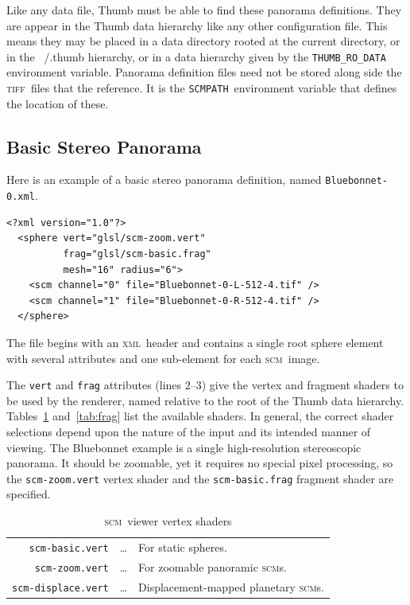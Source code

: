 \documentclass[oneside,10pt]{memoir}
\newcommand{\scm}     {\textsc{scm}}
\newcommand{\tiff}    {\textsc{tiff}}
\newcommand{\xml}     {\textsc{xml}}
\newcommand{\scmpath}{\texttt{SCMPATH}}
\newcommand{\B}{\bigstrut[b]}
\newcommand{\T}{\bigstrut[t]}
\begin{document}
\begin{Spacing}{1.1}
Like any data file, Thumb must be able to find these panorama definitions. They are appear in the Thumb data hierarchy like any other configuration file. This means they may be placed in a data directory rooted at the current directory, or in the ~/.thumb hierarchy, or in a data hierarchy given by the \texttt{THUMB\_RO\_DATA} environment variable. Panorama definition files need not be stored along side the \tiff\ files that the reference. It is the \scmpath\ environment variable that defines the location of these.

\subsection{Basic Stereo Panorama}

Here is an example of a basic stereo panorama definition, named \texttt{Bluebonnet-0.xml}.

\begin{Verbatim}
<?xml version="1.0"?>
  <sphere vert="glsl/scm-zoom.vert"
          frag="glsl/scm-basic.frag"
          mesh="16" radius="6">
    <scm channel="0" file="Bluebonnet-0-L-512-4.tif" />
    <scm channel="1" file="Bluebonnet-0-R-512-4.tif" />
  </sphere>
\end{Verbatim}

The file begins with an \xml\ header and contains a single root sphere element with several attributes and one sub-element for each \scm\ image.

The \texttt{vert} and \texttt{frag} attributes (lines 2--3) give the vertex and fragment shaders to be used by the renderer, named relative to the root of the Thumb data hierarchy. Tables~\ref{tab:vert} and~\ref{tab:frag} list the available shaders. In general, the correct shader selections depend upon the nature of the input and its intended manner of viewing. The Bluebonnet example is a single high-resolution stereoscopic panorama. It should be zoomable, yet it requires no special pixel processing, so the \texttt{scm-zoom.vert} vertex shader and the \texttt{scm-basic.frag} fragment shader are specified.

\begin{table}
  \begin{tabular*}{\textwidth}{rcl}\hline
    \texttt{scm-basic.vert}    & \ldots & For static spheres. \T\\
    \texttt{scm-zoom.vert}     & \ldots & For zoomable panoramic \scm s. \\
    \texttt{scm-displace.vert} & \ldots & Displacement-mapped planetary \scm s. \B\\\hline
  \end{tabular*}
  \caption{\scm\ viewer vertex shaders}
  \label{tab:vert}
\end{table}


\end{Spacing}
\end{document}
